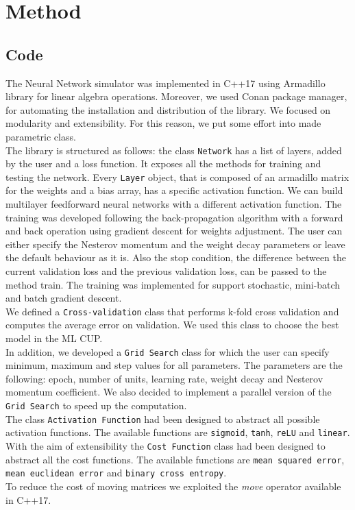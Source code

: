 \section{Method}

\subsection{Code}
The Neural Network simulator was implemented in C++17 using Armadillo library for linear algebra operations. Moreover, we used Conan package manager, for automating the installation and distribution of the library. We focused on modularity and extensibility. For this reason, we put some effort into made parametric class.
\\
The library is structured as follows:
the class \texttt{Network} has a list of layers, added by the user and a loss function. It exposes all the methods for training and testing the network. Every \texttt{Layer} object, that is composed of an armadillo matrix for the weights and a bias array, has a specific activation function. We can build  multilayer feedforward neural networks with a different activation function. The training was developed following the back-propagation algorithm with a forward and back operation using gradient descent for weights adjustment. The user can either specify the Nesterov momentum and the weight decay parameters or leave the default behaviour as it is. Also the stop condition, the difference between the current validation loss and the previous validation loss, can be passed to the method train. The training was implemented for support stochastic, mini-batch and batch gradient descent.
\\
We defined a \texttt{Cross-validation} class that performs k-fold cross validation and computes the average error on validation. We used this class to choose the best model in the ML CUP.
\\
In addition, we developed a \texttt{Grid Search} class for which the user can specify minimum, maximum and step values for all parameters. The parameters are the following: epoch, number of units, learning rate, weight decay and Nesterov momentum coefficient. We also decided to implement a parallel version of the \texttt{Grid Search} to speed up the computation. 
\\
The class \texttt{Activation Function} had been designed to abstract all possible activation functions. The available functions are \texttt{sigmoid}, \texttt{tanh}, \texttt{reLU} and \texttt{linear}.
With the aim of extensibility the \texttt{Cost Function} class had been designed to abstract all the cost functions.
The available functions are \texttt{mean squared error}, \texttt{mean euclidean error} and \texttt{binary cross entropy}.
\\
To reduce the cost of moving matrices we exploited the \textit{move} operator available in C++17.

